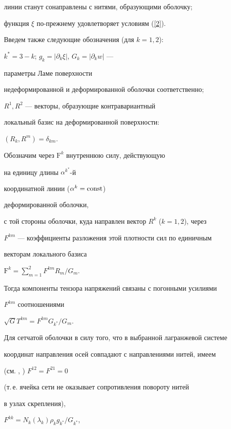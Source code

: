 линии станут сонаправлены с нитями, образующими оболочку;


функция $\xi$ по-прежнему удовлетворяет условиям (\ref{2}).





Введем также следующие обозначения (для $k=1,2$):


$k^*=3-k$; $g_k=| \partial_k \xi |$, $G_{k}=| \partial_k w |$ ---


параметры Ламе поверхности 


недеформированной и деформированной оболочки соответственно; 


$R^1,R^2$ --- векторы, образующие контравариантный


локальный базис на деформированной поверхности:


$(R_k,R^m)=\delta_{km}$.





Обозначим через $\mathrm F^k$ внутреннюю силу, действующую


на единицу длины $\alpha^{k^*}$-й


координатной линии ($\alpha^k=\operatorname{const}$) 


деформированной оболочки,


с той стороны оболочки, куда направлен вектор $R^k$ ($k=1,2$), через


$F^{km}$ --- коэффициенты разложения этой плотности сил по единичным 


векторам локального базиса


$\mathrm F^k=\sum\limits_{m=1}^2 F^{km} R_m / G_m$.


Тогда компоненты тензора напряжений связаны с погонными усилиями 


$F^{km}$ соотношениями \cite{R_Gul}


$\sqrt G T^{km}=F^{km}G_{k^*}/G_m$.





Для сетчатой оболочки в силу того, что в выбранной лагранжевой системе


координат направления осей совпадают с направлениями нитей, имеем


(см. \cite{R_Gul}, \cite{B_Bux}) $F^{12}=F^{21}=0$


(т.\,е. ячейка сети не оказывает сопротивления повороту нитей 


в узлах скрепления),


$F^{kk}=N_k(\lambda_k)\rho_k g_{k^*}/G_{k^*}$,


